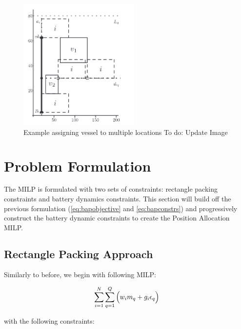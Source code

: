\documentclass[letterpaper, 10pt, conference]{IEEEtran}
\newcommand{\TODO}[1]{{\color{green} To do: #1}} %
\begin{document}
\begin{figure}
	\centerline{\includegraphics[width=6cm]{multipleassign.png}}
	\caption{Example assigning vessel to multiple locations\TODO{Update Image}}
	\label{fig:multipleassign}
\end{figure}

%
\section{Problem Formulation}
\label{sec:problemformulation}
The MILP is formulated with two sets of constraints: rectangle packing constraints and battery dynamics constraints. This section will build off the previous formulation (\eqref{eq:bapobjective} and \eqref{eq:bapconstrs}) and progressively construct the battery dynamic constraints to create the Position Allocation MILP.

\subsection{Rectangle Packing Approach}
Similarly to before, we begin with following MILP:

\begin{equation}\label{eq:objective}
    \sum_{i=1}^N \sum_{q=1}^Q \Big( w_i m_q + g_i \epsilon_q \Big) \\
\end{equation}

with the following constraints:
\end{document}
